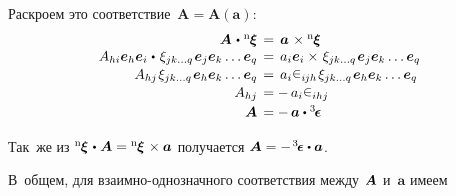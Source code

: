 \begin{otherlanguage}{russian}
Раскроем это соответствие~${\bm{A} \!=\! \bm{A}(\bm{a})}$:
\nopagebreak\[\begin{array}{r@{\hspace{1ex}}c@{\hspace{1ex}}l}
\bm{A} \hspace{0.2ex}\dotp\hspace{0.1ex} {^\mathrm{n}\hspace{-0.12ex}\bm{\xi}} & = & \bm{a} \hspace{0.2ex}\times {^\mathrm{n}\hspace{-0.12ex}\bm{\xi}} \\
%
A_{hi} \bm{e}_h \bm{e}_i \hspace{0.1ex}\dotp\hspace{0.25ex} \xi_{jk \ldots q} \hspace{0.2ex} \bm{e}_j \bm{e}_k \ldots \bm{e}_q & = & a_{i} \bm{e}_i \times\hspace{0.2ex} \xi_{jk \ldots q} \hspace{0.2ex} \bm{e}_j \bm{e}_k \ldots \bm{e}_q \\[0.1em]
%
A_{hj} \hspace{0.2ex} \xi_{jk \ldots q} \hspace{0.2ex} \bm{e}_h \bm{e}_k \ldots \bm{e}_q & = & a_{i} \levicivita_{i\hspace{-0.1ex}jh} \hspace{0.2ex} \xi_{jk \ldots q} \hspace{0.2ex} \bm{e}_h \bm{e}_k \ldots \bm{e}_q \\[0.1em]
%
A_{hj} & = & \! - \, a_{i} \levicivita_{ihj} \\[0.2em]
\bm{A} & = & \! - \, \bm{a} \dotp \levicivitatensor
\end{array}\]

Так~же из ${{^\mathrm{n}\hspace{-0.12ex}\bm{\xi}} \hspace{0.2ex}\dotp\hspace{0.1ex} \bm{A} = {^\mathrm{n}\hspace{-0.12ex}\bm{\xi}} \hspace{0.2ex}\times \bm{a}}$ получается ${\bm{A} = - \hspace{0.2ex} \levicivitatensor \dotp \bm{a}}$.

В~общем, для взаимно\hbox{-}однозначного соответствия между~${\hspace{-0.2ex}\bm{A}}$ и~$\bm{a}$ имеем


\end{otherlanguage}
